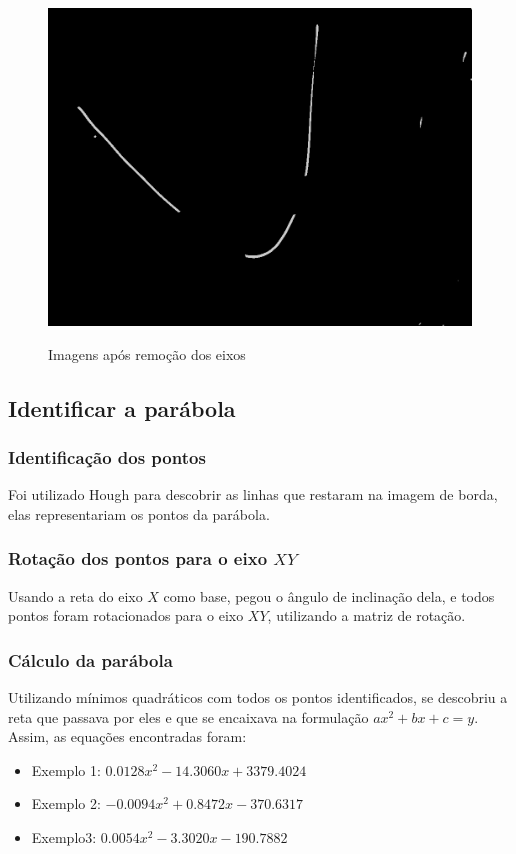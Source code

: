 \documentclass{article}
\begin{document}
\begin{figure}[h!]
        {\includegraphics[scale=0.1]{exemplo3WithoutAxis.jpg}}
    \caption{Imagens após remoção dos eixos }
    \end{figure}

\subsection{Identificar a parábola}

    \subsubsection{Identificação dos pontos}
    Foi utilizado Hough para descobrir as linhas que restaram na imagem de borda, elas representariam os pontos da parábola.
    \subsubsection{Rotação dos pontos para o eixo \(XY\)}
    Usando a reta do eixo \(X\) como base, pegou o ângulo de inclinação dela, e todos pontos foram rotacionados para o eixo \(XY\), utilizando a matriz de rotação.
    \subsubsection{Cálculo da parábola}
    Utilizando mínimos quadráticos com todos os pontos identificados, se descobriu a reta que passava por eles e que se encaixava na formulação \(ax^2 + bx + c = y\). Assim, as equações encontradas foram:
   \begin{itemize}
       \item Exemplo 1:  \(0.0128x^2 -14.3060x+3379.4024\)
       \item Exemplo 2: \(-0.0094x^2+0.8472x-370.6317\)
       \item Exemplo3:  \(0.0054x^2-3.3020x-190.7882\)
   \end{itemize}
\end{document}
